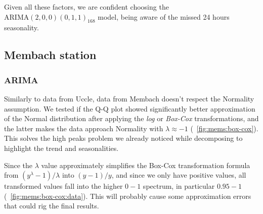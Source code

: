\documentclass[12pt]{article}
\begin{document}

Given all these factors, we are confident choosing the $\mathrm{ARIMA}(2,0,0)(0,1,1)_{168}$ model, being aware of the missed 24 hours seasonality.


\subsection{Membach station}
\subsubsection{ARIMA}
Similarly to data from Uccle, data from Membach doesn't respect the Normality assumption. We tested if the Q-Q plot showed significantly better approximation of the Normal distribution after applying the \textit{log} or \textit{Box-Cox} transformations, and the latter makes the data approach Normality with $\lambda\approx-1$ (\figurename~\ref{fig:mems:box-cox}). This solves the high peaks problem we already noticed while decomposing to highlight the trend and seasonalities.

Since the $\lambda$ value approximately simplifies the Box-Cox transformation formula from $(y^\lambda-1)/\lambda$ into $(y-1)/y$, and since we only have positive values, all transformed values fall into the higher $0-1$ spectrum, in particular $0.95-1$ (\figurename~\ref{fig:mems:box-cox:data}). This will probably cause some approximation errors that could rig the final results.
\end{document}
